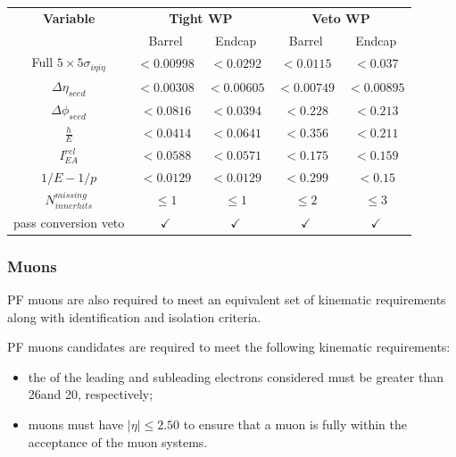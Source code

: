 \begin{table}[htbp]
\label{tab:electronCuts}
  \centering
 \begin{tabular}{ccccc}
   \hline
   \textbf{Variable} & \multicolumn{2}{c}{\textbf{Tight WP}} & \multicolumn{2}{c}{\textbf{Veto WP}}   \\
    & Barrel & Endcap & Barrel & Endcap \\
    \hline   
    Full $5\times5 \sigma_{i\eta i\eta}$ & $< 0.00998$ & $< 0.0292$ & $< 0.0115$ & $< 0.037$ \\
    $\Delta \eta_{seed}$ & $<0.00308$ & $<0.00605$ & $<0.00749$ & $<0.00895$ \\
    $\Delta \phi_{seed}$ & $<0.0816$ & $<0.0394$ & $<0.228$ & $<0.213$ \\
    $\frac{h}{E}$ & $<0.0414$ & $<0.0641$ & $<0.356$ & $<0.211$	\\
    $I^{rel}_{EA}$ & $<0.0588$ & $<0.0571$ & $<0.175$ & $<0.159$ \\
    $1/E - 1/p$ & $<0.0129$ & $<0.0129$ & $<0.299$ & $<0.15$ \\
    $N^{missing}_{inner hits}$ & $\leq 1$ & $\leq 1$ & $\leq 2$ & $\leq 3$ \\
    pass conversion veto & $\checkmark$ & $\checkmark$ & $\checkmark$ & $\checkmark$ \\
    \hline
 \end{tabular}%
\end{table}

\subsubsection{Muons}\label{subsubsec:muonSelection}
PF muons are also required to meet an equivalent set of kinematic requirements along with identification and isolation criteria.

PF muons candidates are required to meet the following kinematic requirements:
\begin{itemize}
\item the \pt of the leading and subleading electrons considered must be greater than 26\GeVc and 20\GeVc, respectively;
\item muons must have $|\eta| \leq 2.50$ to ensure that a muon is fully within the acceptance of the muon systems.
\end{itemize}


